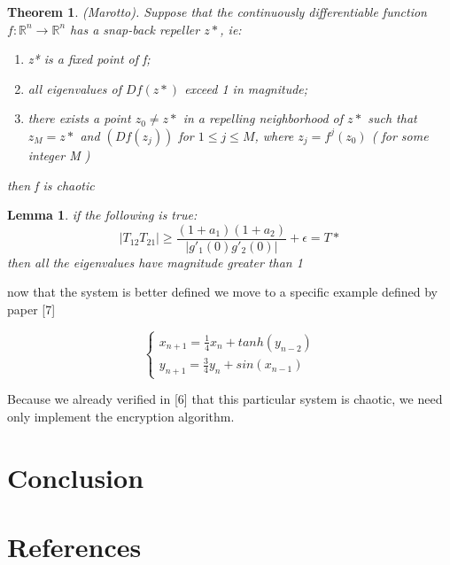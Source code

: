 \documentclass[12pt, letterpaper]{article}
\newtheorem{theorem}{Theorem}
\newtheorem{lemma}{Lemma}
\begin{document}
\begin{theorem}(Marotto). Suppose that the continuously differentiable function \(f:\mathbb{R}^{n} \rightarrow \mathbb{R}^{n}\) has a snap-back repeller \(z*\), ie:
\begin{enumerate}
    \item z* is a fixed point of f;
    \item all eigenvalues of \(Df(z*)\) exceed 1 in magnitude;
    \item there exists a point \(z_{0} \neq z*\) in a repelling neighborhood of \(z*\) such that \(z_M = z*\) and \((Df(z_{j}))\) for \(1 \leq j \leq M\), where \(z_{j} = f^{j}(z_{0})\) ( for some integer M )\\
\end{enumerate}
then f is chaotic
\end{theorem}

\begin{lemma} if the following is true:
\[
|T_{12}T_{21}| \geq \frac{(1+a_{1})(1 + a_{2})}{|g'_{1}(0)g'_{2}(0)|} + \epsilon = T*
\]
then all the eigenvalues have magnitude greater than 1
\end{lemma}

now that the system is better defined we move to a specific example defined by paper [7]

\[
    \begin{cases}
        x_{n+1} = \frac{1}{4}x_{n} + tanh(y_{n - 2})\\
        y_{n+1} = \frac{3}{4}y_{n} + sin(x_{n - 1})
    \end{cases}
\]

Because we already verified in [6] that this particular system is chaotic, we need only implement the encryption algorithm.

\section*{Conclusion}

\section*{References}

\fontsize{8}{12}\selectfont
\end{document}
